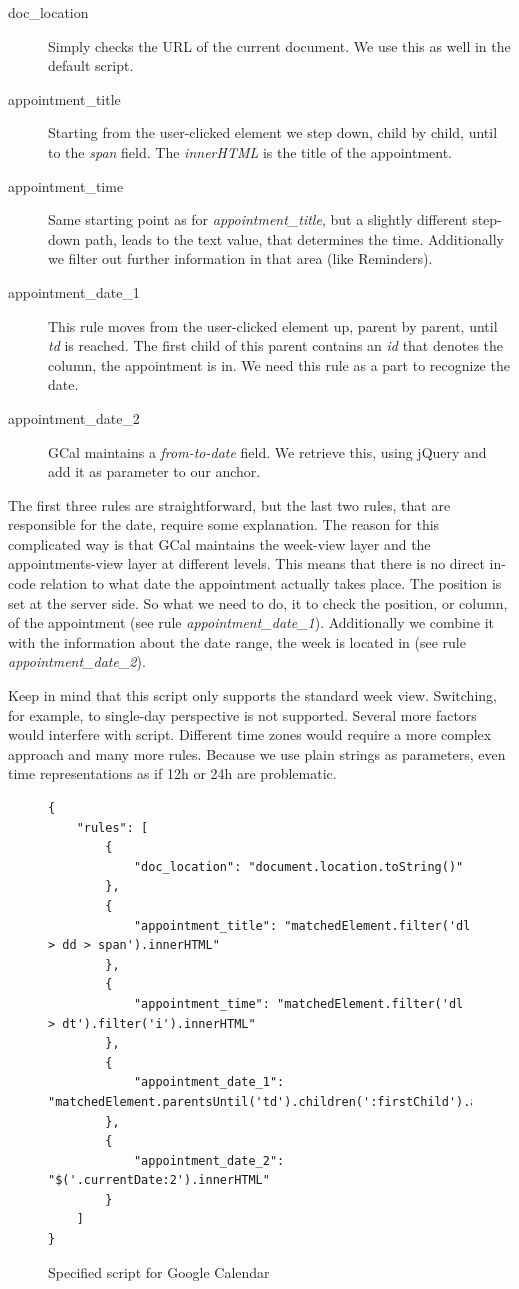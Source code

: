\begin{description}
\item[doc\_location] Simply checks the URL of the current document. We use this as well in the default script. 
\item[appointment\_title] Starting from the user-clicked element we step down, child by child, until to the \emph{span} field. The \emph{innerHTML} is the title of the appointment. 
\item[appointment\_time] Same starting point as for \emph{appointment\_title}, but a slightly different step-down path, leads to the text value, that determines the time. Additionally we filter out further information in that area (like Reminders). 
\item[appointment\_date\_1] This rule moves from the user-clicked element up, parent by parent, until \emph{td} is reached. The first child of this parent contains an \emph{id} that denotes the column, the appointment is in. We need this rule as a part to recognize the date.

\item[appointment\_date\_2] GCal maintains a \emph{from-to-date} field. We retrieve this, using jQuery and add it as parameter to our anchor. 
\end{description}

The first three rules are straightforward, but the last two rules, that are responsible for the date, require some explanation. The reason for this complicated way is that GCal maintains the week-view layer and the appointments-view layer at different levels. This means that there is no direct in-code relation to what date the appointment actually takes place. The position is set at the server side. So what we need to do, it to check the position, or column, of the appointment (see rule \emph{appointment\_date\_1}). Additionally we combine it with the information about the date range, the week is located in (see rule \emph{appointment\_date\_2}). 

Keep in mind that this script only supports the standard week view. Switching, for example, to single-day perspective is not supported. Several more factors would interfere with script. Different time zones would require a more complex approach and many more rules. Because we use plain strings as parameters, even time representations as if 12h or 24h are problematic.

\begin{figure}\centering
\begin{lstlisting}
{
    "rules": [
        {
            "doc_location": "document.location.toString()"
        },
        {
            "appointment_title": "matchedElement.filter('dl > dd > span').innerHTML"
        },
        {
            "appointment_time": "matchedElement.filter('dl > dt').filter('i').innerHTML"
        },
        {
            "appointment_date_1": "matchedElement.parentsUntil('td').children(':firstChild').attr('id')"
        },
        {
            "appointment_date_2": "$('.currentDate:2').innerHTML"
        }
    ]
}
\end{lstlisting}
\caption{Specified script for Google Calendar}
\label{gcal-spec-script}
\end{figure} 

